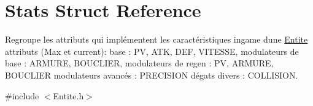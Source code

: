 \hypertarget{struct_stats}{}\section{Stats Struct Reference}
\label{struct_stats}


Regroupe les attributs qui implémentent les caractéristiques ingame d\textquotesingle{}une \mbox{\hyperlink{class_entite}{Entite}} attributs (Max et current)\+: base \+: PV, A\+TK, D\+EF, V\+I\+T\+E\+S\+SE, modulateurs de base \+: A\+R\+M\+U\+RE, B\+O\+U\+C\+L\+I\+ER, modulateurs de regen \+: PV, A\+R\+M\+U\+RE, B\+O\+U\+C\+L\+I\+ER modulateurs avancés \+: P\+R\+E\+C\+I\+S\+I\+ON dégats divers \+: C\+O\+L\+L\+I\+S\+I\+ON.  




{\ttfamily \#include $<$Entite.\+h$>$}

